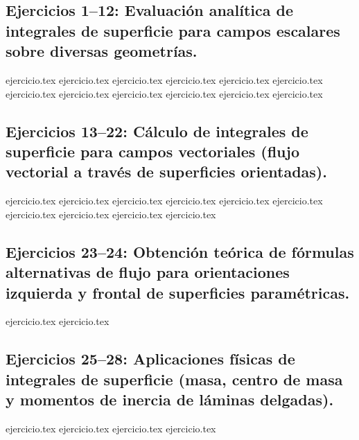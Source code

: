 
\subsection*{Ejercicios 1--12: Evaluación analítica de integrales de superficie para campos escalares sobre diversas geometrías.}
\begin{enumerate}
    {ejercicio.tex}
    {ejercicio.tex}
    {ejercicio.tex}
    {ejercicio.tex}
    {ejercicio.tex}
    {ejercicio.tex}
    {ejercicio.tex}
    {ejercicio.tex}
    {ejercicio.tex}
    {ejercicio.tex}
    {ejercicio.tex}
    {ejercicio.tex}
\end{enumerate}

\subsection*{Ejercicios 13--22: Cálculo de integrales de superficie para campos vectoriales (flujo vectorial a través de superficies orientadas).}
\begin{enumerate}
    \setcounter{enumi}{12}
    {ejercicio.tex}
    {ejercicio.tex}
    {ejercicio.tex}
    {ejercicio.tex}
    {ejercicio.tex}
    {ejercicio.tex}
    {ejercicio.tex}
    {ejercicio.tex}
    {ejercicio.tex}
    {ejercicio.tex}
\end{enumerate}

\subsection*{Ejercicios 23--24: Obtención teórica de fórmulas alternativas de flujo para orientaciones izquierda y frontal de superficies paramétricas.}
\begin{enumerate}
    \setcounter{enumi}{22}
    {ejercicio.tex}
    {ejercicio.tex}
\end{enumerate}

\subsection*{Ejercicios 25--28: Aplicaciones físicas de integrales de superficie (masa, centro de masa y momentos de inercia de láminas delgadas).}
\begin{enumerate}
    \setcounter{enumi}{24}
    {ejercicio.tex}
    {ejercicio.tex}
    {ejercicio.tex}
    {ejercicio.tex}
\end{enumerate}

